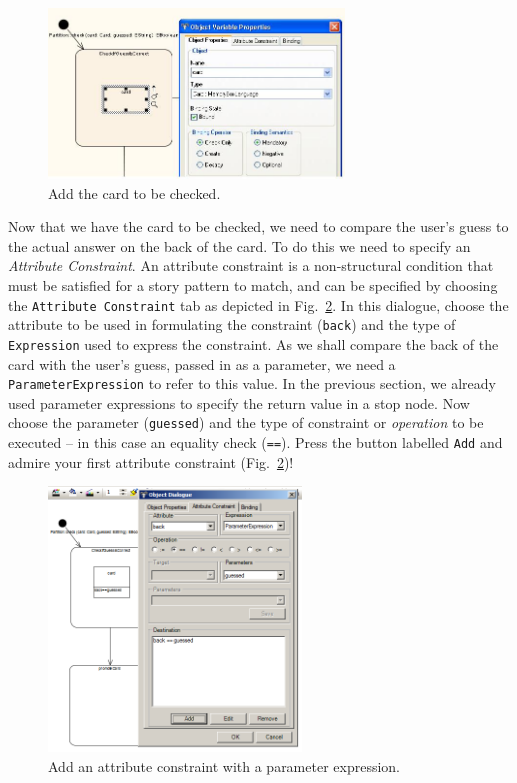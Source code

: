 \begin{figure}[htbp]
\begin{center}
  \includegraphics[width=0.7\textwidth]{pics/sdmBilder/check/sdm17RAW}
  \caption{Add the card to be checked.}  
  \label{fig:sdm_check_addCard}
\end{center}
\end{figure}

Now that we have the card to be checked, we need to compare the user's guess to
the actual answer on the back of the card.  To do this we need to specify an
\emph{Attribute Constraint}.  An attribute constraint is a
non-structural condition that must be satisfied for a story pattern to match,
and can be specified by choosing the \texttt{Attribute Constraint} tab as
depicted in Fig.~\ref{fig:sdm_check_att_constraint}.  In this dialogue, choose
the attribute to be used in formulating the constraint (\texttt{back}) and the
type of \texttt{Expression} used to express the constraint.  As we shall compare
the back of the card with the user's guess, passed in as a parameter, we need a
\texttt{ParameterExpression} to refer to this value.  In the previous section,
we already used parameter expressions to specify the return value in a stop
node.  Now choose the parameter (\texttt{guessed}) and the type of
constraint or \emph{operation} to be executed -- in this case an equality check
(\texttt{==}). Press the button labelled \texttt{Add} and admire your first
attribute constraint (Fig.~\ref{fig:sdm_check_att_constraint})!

\clearpage
\begin{figure}[!htbp] 
\begin{center}
  \includegraphics[width=0.6\textwidth]{pics/sdmBilder/check/sdm18RAW}
  \caption{Add an attribute constraint with a parameter expression.}  
  \label{fig:sdm_check_att_constraint}
\end{center}
\end{figure} 

